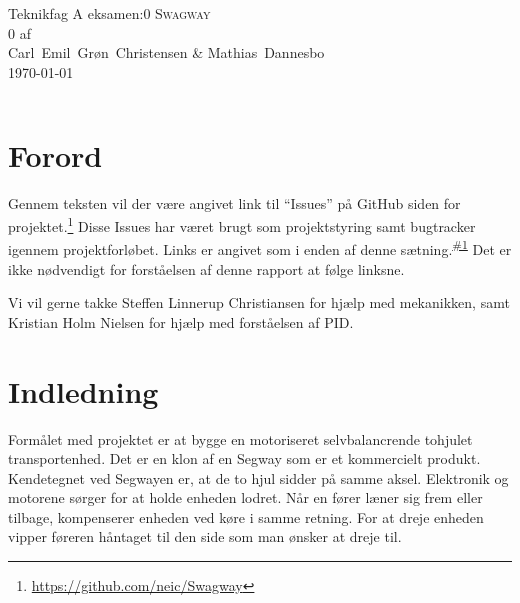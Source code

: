 \documentclass[a4paper,oneside,article,danish,table]{memoir}
\newcommand{\authorvar}{Carl~Emil~Grøn~Christensen \& Mathias~Dannesbo}
\newcommand{\pretitlevar}{Teknikfag A eksamen:}
\newcommand{\titlevar}{Swagway}
\newcommand{\subtitlevar}{0}
\newcommand{\datevar}{\today}
\newcommand{\issue}[1]{\textsuperscript{\textcolor{blue!80!black}{\href{https://github.com/neic/Swagway/issues/#1}{\##1}}}}
\begin{document}

\begin{center}
  \if\pretitlevar 0
  \else{\Large\pretitlevar\\} \fi
  \textsc{\HUGE\titlevar\\}
  \if\subtitlevar 0
  \else {\Large\subtitlevar\\} \fi
  {\LARGE 
  af\\
   \authorvar}\\
 \datevar\\
\end{center}

\vfill
\begin{abstract} %
\end{abstract}\vfill
\noindent
\begin{tabular*}{\textwidth}{@{\extracolsep{\fill}} ll}

\end{tabular*}
\thispagestyle{empty}
\clearpage

\chapter*{Forord}\label{chap:for}
Gennem teksten vil der være angivet link til “Issues” på GitHub siden for projektet.\footnote{\url{https://github.com/neic/Swagway}} Disse Issues har været brugt som projektstyring samt bugtracker igennem projektforløbet. Links er angivet som i enden af denne sætning.\issue{1} Det er ikke nødvendigt for forståelsen af denne rapport at følge linksne.

Vi vil gerne takke Steffen Linnerup Christiansen for hjælp med mekanikken, samt Kristian Holm Nielsen for hjælp med forståelsen af PID.

\clearpage \setcounter{tocdepth}{1} \tableofcontents \clearpage

\chapter{Indledning}\label{chap:ind}

Formålet med projektet er at bygge en motoriseret selvbalancrende tohjulet transportenhed. Det er en klon af en Segway som er et kommercielt produkt. Kendetegnet ved Segwayen er, at de to hjul sidder på samme aksel. Elektronik og motorene sørger for at holde enheden lodret. Når en fører læner sig frem eller tilbage, kompenserer enheden ved køre i samme retning. For at dreje enheden vipper føreren håntaget til den side som man ønsker at dreje til.
\end{document}
